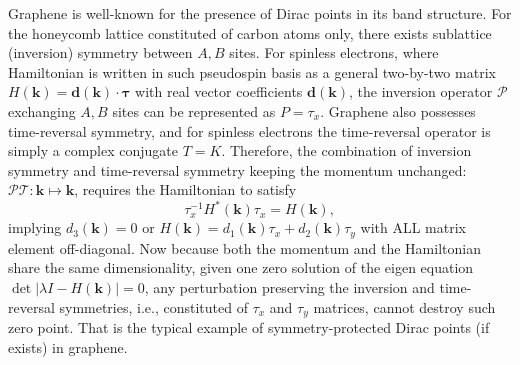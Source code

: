 Graphene is well-known for the presence of Dirac points in its band structure. For the honeycomb lattice constituted of carbon atoms only, there exists sublattice (inversion) symmetry between $A,B$ sites. For spinless electrons, where Hamiltonian is written in such pseudospin basis as a general two-by-two matrix $H(\bm k)=\bm d(\bm k)\cdot\bm \tau$ with real vector coefficients $\bm d(\bm k)$, the inversion operator $\mathcal P$ exchanging $A,B$ sites can be represented as $P=\tau_x$. Graphene also possesses time-reversal symmetry, and for spinless electrons the time-reversal operator is simply a complex conjugate $T=K$. Therefore, the combination of inversion symmetry and time-reversal symmetry keeping the momentum unchanged: $\mathcal P\mathcal T:\bm k\mapsto\bm k$, requires the Hamiltonian to satisfy
\begin{equation*}
    \tau_x^{-1}H^*(\bm k)\tau_x=H(\bm k),
\end{equation*}
implying $d_3(\bm k)=0$ or $H(\bm k)=d_1(\bm k)\tau_x+d_2(\bm k)\tau_y$ with ALL matrix element off-diagonal. Now because both the momentum and the Hamiltonian share the same dimensionality, given one zero solution of the eigen equation $\det|\lambda I-H(\bm k)|=0$, any perturbation preserving the inversion and time-reversal symmetries, i.e., constituted of $\tau_x$ and $\tau_y$ matrices, cannot destroy such zero point. That is the typical example of symmetry-protected Dirac points (if exists) in graphene.

